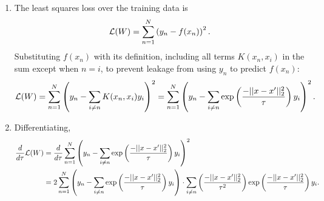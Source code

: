 \documentclass[submit]{harvardml}
\begin{document}
\begin{enumerate}
	\item The least squares loss over the training data is
	$$\mathcal{L}(W) = \sum_{n=1}^N \left(y_n - f(x_n)\right)^2.$$
	Substituting $f(x_n)$ with its definition, including all terms $K(x_n, x_i)$ in the sum except when $n = i$, to prevent leakage from using $y_n$ to predict $f(x_n)$:
	$$\mathcal{L}(W) = \sum_{n=1}^N \left(y_n - \sum_{i \neq n} K(x_n, x_i)y_i\right)^2
	= \sum_{n=1}^N \left(y_n - \sum_{i \neq n} \exp\left(\frac{-||x-x'||^2_2}{\tau}\right)y_i\right)^2.$$
	
	\item Differentiating,
	\begin{align*}
		\frac{d}{d\tau} \mathcal{L}(W) &= \frac{d}{d\tau} \sum_{n=1}^N \left(y_n - \sum_{i \neq n} \exp\left(\frac{-||x-x'||^2_2}{\tau}\right)y_i\right)^2 \\
		&= 2 \sum_{n=1}^N \left(y_n - \sum_{i \neq n} \exp\left(\frac{-||x-x'||^2_2}{\tau}\right)y_i\right) \cdot \sum_{i \neq n} \left(\frac{-||x-x'||^2_2}{\tau^2}\right) \exp\left(\frac{-||x-x'||^2_2}{\tau}\right)y_i.
	\end{align*}
	
	
\end{enumerate}

\newpage
\end{document}

